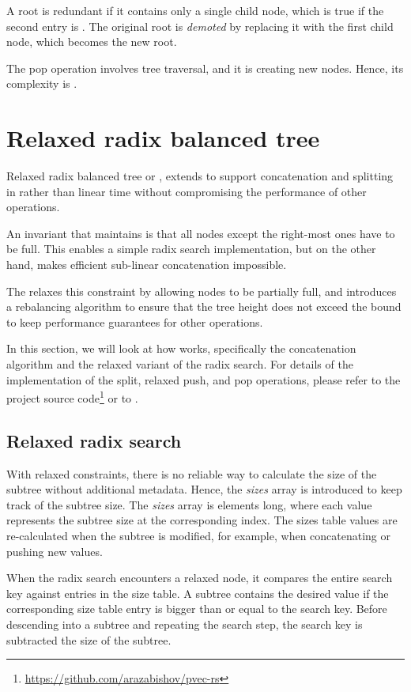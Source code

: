 A root is redundant if it contains only a single child node, which is true if the second entry is \nil{}.  The original root is \emph{demoted} by replacing it with the first child node, which becomes the new root.

The pop operation involves tree traversal, and it is creating \m{} new nodes. Hence, its complexity is .

\section{Relaxed radix balanced tree}
\label{sec:rrb-tree}

Relaxed radix balanced tree or \treerrb{}, extends \treerb{} to support concatenation and splitting in  rather than linear time without compromising the performance of other operations.

An invariant that \treerb{} maintains is that all nodes except the right-most ones have to be full. This enables a simple radix search implementation, but on the other hand, makes efficient sub-linear concatenation impossible.

The \treerrb{} relaxes this constraint by allowing nodes to be partially full, and introduces a rebalancing algorithm to ensure that the tree height does not exceed the  bound to keep performance guarantees for other operations.

In this section, we will look at how \treerrb{} works, specifically the concatenation algorithm and the relaxed variant of the radix search. For details of the implementation of the split, relaxed push, and pop operations, please refer to the project source code\footnote{\url{https://github.com/arazabishov/pvec-rs}} or to \cite{improving-performance-through-transience}.

\subsection{Relaxed radix search}
With relaxed \treerrb{} constraints, there is no reliable way to calculate the size of the subtree without additional metadata. Hence, the \emph{sizes} array is introduced to keep track of the subtree size. The \emph{sizes} array is \m{} elements long, where each value represents the subtree size at the corresponding index. The sizes table values are re-calculated when the subtree is modified, for example, when concatenating or pushing new values.

When the radix search encounters a relaxed node, it compares the entire search key against entries in the size table. A subtree contains the desired value if the corresponding size table entry is bigger than or equal to the search key. Before descending into a subtree and repeating the search step, the search key is subtracted the size of the subtree.

